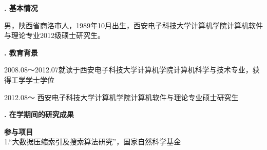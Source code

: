 \begin{authorintro}

{
    \bf\songti{}
    . 基本情况
}

男，陕西省商洛市人，1989年10月出生，西安电子科技大学计算机学院计算机软件与理论专业2012级硕士研究生。

{
    \bf\songti{}
    . 教育背景
}

2008.08～2012.07\quad\quad 就读于西安电子科技大学计算机学院计算机科学与技术专业，获得工学学士学位

2012.08～\hspace{2.2cm}       西安电子科技大学计算机学院计算机软件与理论专业硕士研究生



{
    \bf\songti{}
    . 在学期间的研究成果
}

\end{authorintro}

{\bf \noindent 参与项目}\\
1.“大数据压缩索引及搜索算法研究”，国家自然科学基金

